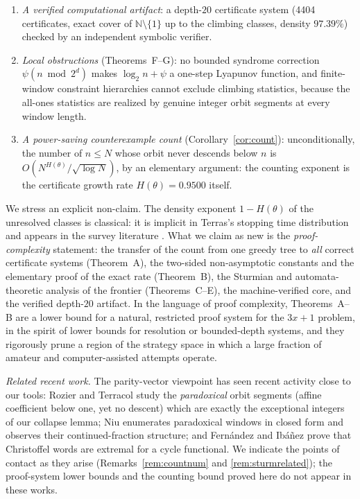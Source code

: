 \documentclass[11pt]{article}
\theoremstyle{definition}
\newcommand{\N}{\mathbb{N}}
\begin{document}
\begin{enumerate}
  with its remainder bound, both halves of the adaptive collapse lemma,
  and the persistence step), all from the standard axioms alone
  (Section~\ref{sec:artifacts}).
\item[(v)] \emph{A verified computational artifact}: a depth-$20$
  certificate system (4404 certificates, exact cover of $\N\setminus\{1\}$
  up to the climbing classes, density $97.39\%$) checked by an independent
  symbolic verifier.
\item[(vi)] \emph{Local obstructions} (Theorems~F--G): no bounded
  syndrome correction $\psi(n\bmod 2^d)$ makes $\log_2 n+\psi$ a one-step
  Lyapunov function, and finite-window constraint hierarchies cannot
  exclude climbing statistics, because the all-ones statistics are realized
  by genuine integer orbit segments at every window length.
\item[(vii)] \emph{A power-saving counterexample count}
  (Corollary~\ref{cor:count}): unconditionally, the number of $n\le N$
  whose orbit never descends below $n$ is $O(N^{H(\theta)}/\sqrt{\log N})$,
  by an elementary argument: the counting exponent is the certificate
  growth rate $H(\theta)=0.9500$ itself.
\end{enumerate}

We stress an explicit non-claim. The density exponent $1-H(\theta)$
of the unresolved classes is classical: it is implicit in Terras's stopping
time distribution \cite{Terras1976} and appears in the survey literature
\cite{Lagarias1985,Korec1994,ApplegateLagarias1995}. What we claim as new is
the \emph{proof-complexity} statement: the transfer of the count from one
greedy tree to \emph{all} correct certificate systems (Theorem~A), the
two-sided non-asymptotic constants and the elementary proof of the exact
rate (Theorem~B), the Sturmian and automata-theoretic analysis of the
frontier (Theorems~C--E), the machine-verified core, and the verified
depth-$20$ artifact. In the language of proof complexity, Theorems~A--B are
a lower bound for a natural, restricted proof system for the $3x+1$
problem, in the spirit of lower bounds for resolution or bounded-depth
systems, and they rigorously prune a region of the strategy space in which
a large fraction of amateur and computer-assisted attempts operate.

\emph{Related recent work.} The parity-vector viewpoint has seen recent
activity close to our tools: Rozier and Terracol \cite{RozierTerracol2026}
study the \emph{paradoxical} orbit segments (affine coefficient below one,
yet no descent) which are exactly the exceptional integers of our collapse
lemma; Niu \cite{Niu2026} enumerates paradoxical windows in closed form and
observes their continued-fraction structure; and Fern\'andez and
Ib\'a\~nez \cite{FernandezIbanez2026} prove that Christoffel words are
extremal for a cycle functional. We indicate the points of contact as they
arise (Remarks~\ref{rem:countnum} and \ref{rem:sturmrelated}); the
proof-system lower bounds and the counting bound proved here do not appear
in these works.
\end{document}
